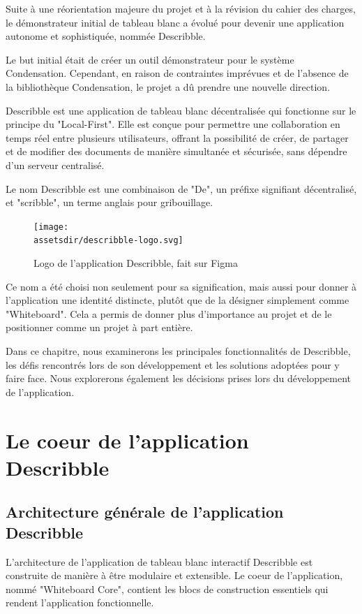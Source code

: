 Suite à une réorientation majeure du projet et à la révision du cahier des charges, le démonstrateur initial de tableau blanc a évolué pour devenir une application autonome et sophistiquée, nommée \Gls{Describble}.

Le but initial était de créer un outil démonstrateur pour le système Condensation. Cependant, en raison de contraintes imprévues et de l'absence de la bibliothèque Condensation, le projet a dû prendre une nouvelle direction.

\Gls{Describble} est une application de tableau blanc décentralisée qui fonctionne sur le principe du "Local-First". Elle est conçue pour permettre une collaboration en temps réel entre plusieurs utilisateurs, offrant la possibilité de créer, de partager et de modifier des documents de manière simultanée et sécurisée, sans dépendre d'un serveur centralisé.

Le nom \Gls{Describble} est une combinaison de "De", un préfixe signifiant décentralisé, et "scribble", un terme anglais pour gribouillage.

\begin{figure}[h]
    \centering
    \texttt{[image: \\assetsdir/describble-logo.svg]}
    \caption{Logo de l'application \Gls{Describble}, fait sur Figma}
\end{figure}

Ce nom a été choisi non seulement pour sa signification, mais aussi pour donner à l'application une identité distincte, plutôt que de la désigner simplement comme "Whiteboard". Cela a permis de donner plus d'importance au projet et de le positionner comme un projet à part entière.

Dans ce chapitre, nous examinerons les principales fonctionnalités de \Gls{Describble}, les défis rencontrés lors de son développement et les solutions adoptées pour y faire face. Nous explorerons également les décisions prises lors du développement de l'application.


\section{Le coeur de l'application \Gls{Describble}}

\subsection{Architecture générale de l'application \Gls{Describble}}

L'architecture de l'application de tableau blanc interactif \Gls{Describble} est construite de manière à être modulaire et extensible. Le coeur de l'application, nommé "Whiteboard Core", contient les blocs de construction essentiels qui rendent l'application fonctionnelle.

